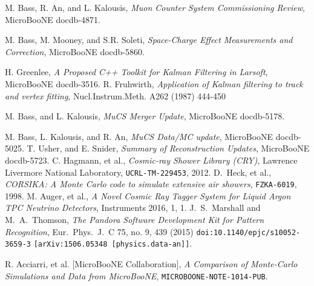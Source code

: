 \documentclass[a4paper]{scrartcl}
\begin{document}
\begin{thebibliography}{9}
 M. Bass, R. An, and L. Kalousis, \textit{Muon Counter System Commissioning Review}, MicroBooNE docdb-4871.

 M. Bass, M. Mooney, and S.R. Soleti, \textit{Space-Charge Effect Measurements and Correction}, MicroBooNE docdb-5860.

 H. Greenlee, \textit{A Proposed C++ Toolkit for Kalman Filtering in Larsoft}, MicroBooNE docdb-3516.
 R. Fruhwirth, \textit{Application of Kalman filtering to track and vertex fitting}, Nucl.Instrum.Meth. A262 (1987) 444-450

 M. Bass, and L. Kalousis, \textit{MuCS Merger Update}, MicroBooNE docdb-5178.

 M. Bass, L. Kalousis, and R. An, \textit{MuCS Data/MC update}, MicroBooNE docdb-5025.
 T. Usher, and E. Snider, \textit{Summary of Reconstruction Updates}, MicroBooNE docdb-5723.
 C. Hagmann, et al., \textit{Cosmic-ray Shower Library (CRY)},  Lawrence Livermore National Laboratory, \texttt{UCRL-TM-229453}, 2012.
 D.~Heck, et al.,
  \textit{CORSIKA: A Monte Carlo code to simulate extensive air showers},
  \texttt{FZKA-6019}, 1998.
 M. Auger, et al., \textit{A Novel Cosmic Ray Tagger System for Liquid Argon TPC Neutrino Detectors}, Instruments 2016, 1, 1.
J.~S.~Marshall and M.~A.~Thomson,
  \textit{The Pandora Software Development Kit for Pattern Recognition},
  Eur.\ Phys.\ J.\ C 75, no. 9, 439 (2015)
  \texttt{doi:10.1140/epjc/s10052-3659-3}
  \texttt{[arXiv:1506.05348 [physics.data-an]]}.

R. Acciarri, et al. [MicroBooNE Collaboration], \textit{A Comparison of Monte-Carlo Simulations and Data from MicroBooNE}, \texttt{MICROBOONE-NOTE-1014-PUB}.
\end{thebibliography}
\end{document}
